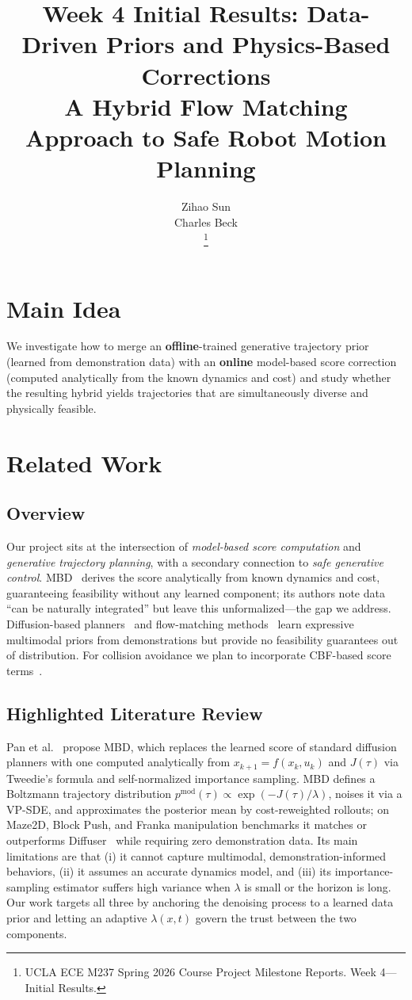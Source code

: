 \documentclass[letterpaper, 10 pt, conference]{ieeeconf}
\title{\LARGE \bf
Week 4 Initial Results: Data-Driven Priors and Physics-Based
Corrections \\ A Hybrid Flow Matching Approach to Safe Robot Motion
Planning}
\author{ \parbox{3 in}{\centering Zihao Sun}
        \hspace*{ 0.1 in}
        \parbox{2.5 in}{ \centering Charles Beck}
\thanks{UCLA ECE M237 Spring 2026 Course Project Milestone Reports.
Week 4---Initial Results.}
}
\begin{document}
\maketitle

\section{Main Idea}

We investigate how to merge an \textbf{offline}-trained generative
trajectory prior (learned from demonstration data) with an
\textbf{online} model-based score correction (computed analytically
from the known dynamics and cost) and study whether the resulting
hybrid yields trajectories that are simultaneously diverse and
physically feasible.

\section{Related Work}
\subsection{Overview}

Our project sits at the intersection of \emph{model-based score
computation} and \emph{generative trajectory planning}, with a
secondary connection to \emph{safe generative control}.
MBD~\cite{mbd} derives the score analytically from known dynamics
and cost, guaranteeing feasibility without any learned component;
its authors note data ``can be naturally integrated'' but leave
this unformalized---the gap we address. Diffusion-based
planners~\cite{janner2022} and flow-matching
methods~\cite{flowmp} learn expressive multimodal priors from
demonstrations but provide no feasibility guarantees out of
distribution. For collision avoidance we plan to incorporate
CBF-based score terms~\cite{safeflow}.

\subsection{Highlighted Literature Review}

Pan et al.~\cite{mbd} propose MBD, which replaces the learned
score of standard diffusion planners with one computed analytically
from $x_{k+1}=f(x_k,u_k)$ and $J(\tau)$ via Tweedie's formula and
self-normalized importance sampling. MBD defines a Boltzmann
trajectory distribution $p^{\mathrm{mod}}(\tau)\propto
\exp(-J(\tau)/\lambda)$, noises it via a VP-SDE, and approximates
the posterior mean by cost-reweighted rollouts; on Maze2D, Block
Push, and Franka manipulation benchmarks it matches or outperforms
Diffuser~\cite{janner2022} while requiring zero demonstration data.
Its main limitations are that (i) it cannot capture multimodal,
demonstration-informed behaviors, (ii) it assumes an accurate
dynamics model, and (iii) its importance-sampling estimator
suffers high variance when $\lambda$ is small or the horizon is
long. Our work targets all three by anchoring the denoising process
to a learned data prior and letting an adaptive $\lambda(x,t)$
govern the trust between the two components.
\end{document}
